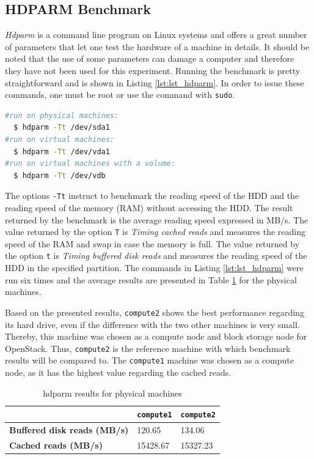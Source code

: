 \subsection{HDPARM Benchmark}
\label{sec:hdparm}
\textit{Hdparm} is a command line program on Linux systems and offers a great number of parameters that let one test the hardware of a machine in details. 
It should be noted that the use of some parameters can damage a computer and therefore they have not been used for this experiment. 
Running the benchmark is pretty straightforward and is shown in Listing \ref{lst:lst_hdparm}.
In order to issue these commands, one must be root or use the command with \texttt{sudo}.

{
\singlespacing
\begin{lstlisting}[frame=single,language=bash,caption={hdparm commands},label={lst:lst_hdparm}]
#run on physical machines:
  $ hdparm -Tt /dev/sda1
#run on virtual machines:
  $ hdparm -Tt /dev/vda1
#run on virtual machines with a volume:
  $ hdparm -Tt /dev/vdb
\end{lstlisting}
}

The options \texttt{-Tt} instruct to benchmark the reading speed of the HDD and the reading speed of the memory (RAM) without accessing the HDD. 
The result returned by the benchmark is the average reading speed expressed in MB/s. 
The value returned by the option \texttt{T} is \textit{Timing cached reads} and measures the reading speed of the RAM and swap in case the memory is full. 
The value returned by the option \texttt{t} is \textit{Timing buffered disk reads} and measures the reading speed of the HDD in the specified partition.
The commands in Listing \ref{lst:lst_hdparm} were run six times and the average results are presented in Table \ref{table:hdparm_res_PM} for the physical machines. 

Based on the presented results, \texttt{compute2} shows the best performance regarding its hard drive, even if the difference with the two other machines is very small. 
Thereby, this machine was chosen as a compute node and block storage node for OpenStack.
Thus, \texttt{compute2} is the reference machine with which benchmark results will be compared to.
The \texttt{compute1} machine was chosen as a compute node, as it has the highest value regarding the cached reads.

\begin{table}[h]
	\centering
	\begin{tabular}{|m{6cm}|m{2.5cm}|m{2.5cm}|}
		\hline
		& 
		\texttt{compute1} & %
		\texttt{compute2} \\ %
		\hline
		\textbf{Buffered disk reads (MB/s)} & 
		120.65 & 
		134.06 \\
		\hline
		\textbf{Cached reads (MB/s)} &  
		15428.67 & 
		15327.23 \\
		\hline
	\end{tabular}
	\caption{hdparm results for physical machines}
	\label{table:hdparm_res_PM}
\end{table}

